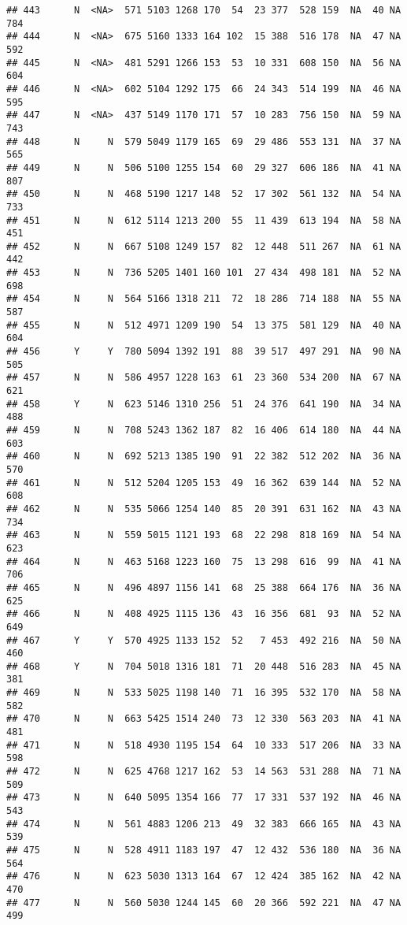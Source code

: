 \documentclass[]{article}
\begin{document}
\begin{verbatim}
## 443      N  <NA>  571 5103 1268 170  54  23 377  528 159  NA  40 NA  784
## 444      N  <NA>  675 5160 1333 164 102  15 388  516 178  NA  47 NA  592
## 445      N  <NA>  481 5291 1266 153  53  10 331  608 150  NA  56 NA  604
## 446      N  <NA>  602 5104 1292 175  66  24 343  514 199  NA  46 NA  595
## 447      N  <NA>  437 5149 1170 171  57  10 283  756 150  NA  59 NA  743
## 448      N     N  579 5049 1179 165  69  29 486  553 131  NA  37 NA  565
## 449      N     N  506 5100 1255 154  60  29 327  606 186  NA  41 NA  807
## 450      N     N  468 5190 1217 148  52  17 302  561 132  NA  54 NA  733
## 451      N     N  612 5114 1213 200  55  11 439  613 194  NA  58 NA  451
## 452      N     N  667 5108 1249 157  82  12 448  511 267  NA  61 NA  442
## 453      N     N  736 5205 1401 160 101  27 434  498 181  NA  52 NA  698
## 454      N     N  564 5166 1318 211  72  18 286  714 188  NA  55 NA  587
## 455      N     N  512 4971 1209 190  54  13 375  581 129  NA  40 NA  604
## 456      Y     Y  780 5094 1392 191  88  39 517  497 291  NA  90 NA  505
## 457      N     N  586 4957 1228 163  61  23 360  534 200  NA  67 NA  621
## 458      Y     N  623 5146 1310 256  51  24 376  641 190  NA  34 NA  488
## 459      N     N  708 5243 1362 187  82  16 406  614 180  NA  44 NA  603
## 460      N     N  692 5213 1385 190  91  22 382  512 202  NA  36 NA  570
## 461      N     N  512 5204 1205 153  49  16 362  639 144  NA  52 NA  608
## 462      N     N  535 5066 1254 140  85  20 391  631 162  NA  43 NA  734
## 463      N     N  559 5015 1121 193  68  22 298  818 169  NA  54 NA  623
## 464      N     N  463 5168 1223 160  75  13 298  616  99  NA  41 NA  706
## 465      N     N  496 4897 1156 141  68  25 388  664 176  NA  36 NA  625
## 466      N     N  408 4925 1115 136  43  16 356  681  93  NA  52 NA  649
## 467      Y     Y  570 4925 1133 152  52   7 453  492 216  NA  50 NA  460
## 468      Y     N  704 5018 1316 181  71  20 448  516 283  NA  45 NA  381
## 469      N     N  533 5025 1198 140  71  16 395  532 170  NA  58 NA  582
## 470      N     N  663 5425 1514 240  73  12 330  563 203  NA  41 NA  481
## 471      N     N  518 4930 1195 154  64  10 333  517 206  NA  33 NA  598
## 472      N     N  625 4768 1217 162  53  14 563  531 288  NA  71 NA  509
## 473      N     N  640 5095 1354 166  77  17 331  537 192  NA  46 NA  543
## 474      N     N  561 4883 1206 213  49  32 383  666 165  NA  43 NA  539
## 475      N     N  528 4911 1183 197  47  12 432  536 180  NA  36 NA  564
## 476      N     N  623 5030 1313 164  67  12 424  385 162  NA  42 NA  470
## 477      N     N  560 5030 1244 145  60  20 366  592 221  NA  47 NA  499

\end{verbatim}
\end{document}
